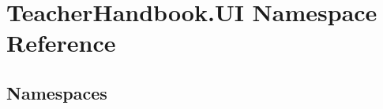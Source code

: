 \hypertarget{namespace_teacher_handbook_1_1_u_i}{}\section{Teacher\+Handbook.\+UI Namespace Reference}
\label{namespace_teacher_handbook_1_1_u_i}
\subsection*{Namespaces}
\begin{DoxyCompactItemize}
\end{DoxyCompactItemize}
